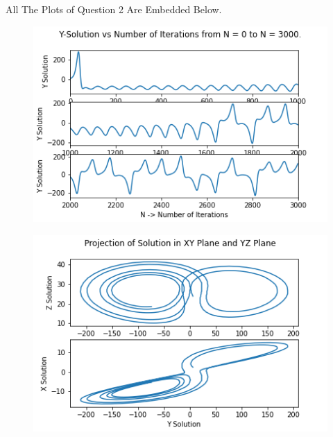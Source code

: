 \documentclass{article}
\begin{document}
All The Plots of Question 2 Are Embedded Below. 

\begin{figure}[!htb]
  \centering
  \includegraphics[width=1\linewidth]{q2_1.png}
  \caption{}
  \label{fig:Q2_plot1.png}
\end{figure}


\begin{figure}[!htb]
  \centering
  \includegraphics[width=1\linewidth]{q2_2.png}
  \caption{}
  \label{fig:Q2_plot2.png}
\end{figure}
\end{document}
